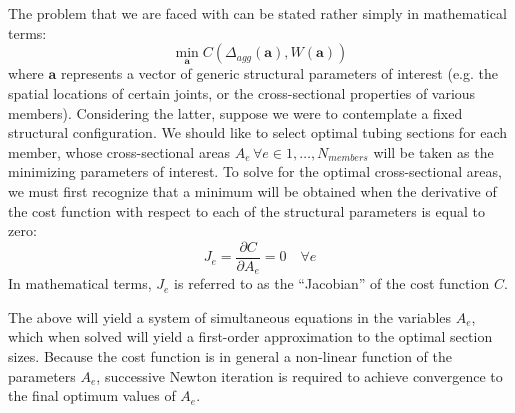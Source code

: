 \documentclass[12pt,a4paper,article]{memoir} %
\begin{document}
The problem that we are faced with can be stated rather simply in mathematical terms:
\begin{equation}
	\min_{\mathbf{a}} C(\Delta_{agg}(\mathbf{a}), W(\mathbf{a}))
\end{equation}
where $\mathbf{a}$ represents a vector of generic structural parameters of interest (e.g. the spatial locations of certain joints, or the cross-sectional properties of various members). Considering the latter, suppose we were to contemplate a fixed structural configuration. We should like to select optimal tubing sections for each member, whose cross-sectional areas $A_e \, \forall e \in 1, \ldots, N_{members}$ will be taken as the minimizing parameters of interest. To solve for the optimal cross-sectional areas, we must first recognize that a minimum will be obtained when the derivative of the cost function with respect to each of the structural parameters is equal to zero:
\begin{equation}
	J_e = \frac{\partial C}{\partial A_e} = 0 \quad \forall e
\end{equation}
In mathematical terms, $J_e$ is referred to as the ``Jacobian'' of the cost function $C$.

The above will yield a system of simultaneous equations in the variables $A_e$, which when solved will yield a first-order approximation to the optimal section sizes. Because the cost function is in general a non-linear function of the parameters $A_e$, successive Newton iteration is required to achieve convergence to the final optimum values of $A_e$.
\end{document}
